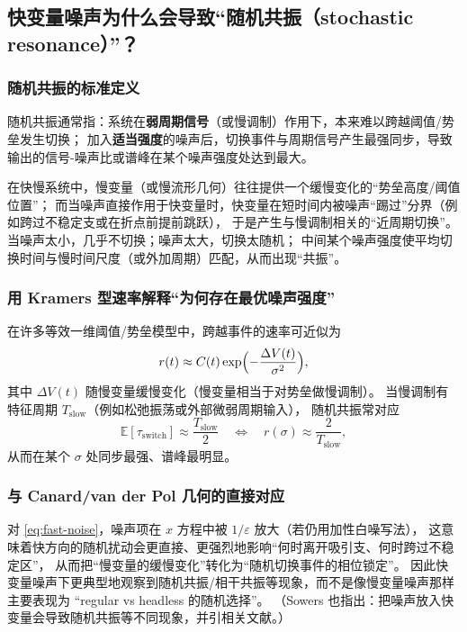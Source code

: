 	\subsection{快变量噪声为什么会导致“随机共振（stochastic resonance）”？}
	
	\subsubsection{随机共振的标准定义}
	随机共振通常指：系统在\textbf{弱周期信号}（或慢调制）作用下，本来难以跨越阈值/势垒发生切换；
	加入\textbf{适当强度}的噪声后，切换事件与周期信号产生最强同步，导致输出的信号-噪声比或谱峰在某个噪声强度处达到最大。
	
	在快慢系统中，慢变量（或慢流形几何）往往提供一个缓慢变化的“势垒高度/阈值位置”；
	而当噪声直接作用于快变量时，快变量在短时间内被噪声“踢过”分界（例如跨过不稳定支或在折点前提前跳跃），
	于是产生与慢调制相关的“近周期切换”。当噪声太小，几乎不切换；噪声太大，切换太随机；
	中间某个噪声强度使平均切换时间与慢时间尺度（或外加周期）匹配，从而出现“共振”。
	
	\subsubsection{用 Kramers 型速率解释“为何存在最优噪声强度”}
	在许多等效一维阈值/势垒模型中，跨越事件的速率可近似为
	\[
	r(t)\approx C(t)\exp\Bigl(-\frac{\Delta V(t)}{\sigma^2}\Bigr),
	\]
	其中 $\Delta V(t)$ 随慢变量缓慢变化（慢变量相当于对势垒做慢调制）。
	当慢调制有特征周期 $T_{\mathrm{slow}}$（例如松弛振荡或外部微弱周期输入），
	随机共振常对应
	\[
	\mathbb E[\tau_{\mathrm{switch}}]\approx \frac{T_{\mathrm{slow}}}{2}
	\quad\Longleftrightarrow\quad
	r(\sigma)\approx \frac{2}{T_{\mathrm{slow}}},
	\]
	从而在某个 $\sigma$ 处同步最强、谱峰最明显。
	
	\subsubsection{与 Canard/van der Pol 几何的直接对应}
	对 \eqref{eq:fast-noise}，噪声项在 $x$ 方程中被 $1/\varepsilon$ 放大（若仍用加性白噪写法），
	这意味着快方向的随机扰动会更直接、更强烈地影响“何时离开吸引支、何时跨过不稳定区”，
	从而把“慢变量的缓慢变化”转化为“随机切换事件的相位锁定”。
	因此快变量噪声下更典型地观察到随机共振/相干共振等现象，而不是像慢变量噪声那样主要表现为
	“regular vs headless 的随机选择”。
	（Sowers 也指出：把噪声放入快变量会导致随机共振等不同现象，并引相关文献。）%
	
